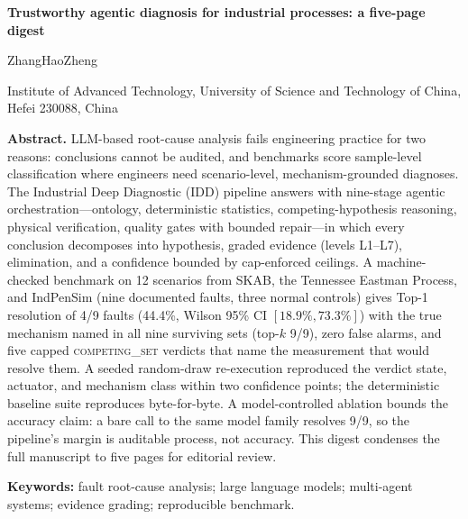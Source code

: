 \documentclass[10pt]{article}
\begin{document}
\begin{center}
{\LARGE\bfseries Trustworthy agentic diagnosis for industrial processes: a five-page digest}\par\vspace{10pt}
{\large ZhangHaoZheng}\par\vspace{2pt}
{\small Institute of Advanced Technology, University of Science and Technology of China, Hefei 230088, China}\par\vspace{14pt}
\end{center}
\begin{center}
\begin{minipage}{0.9\textwidth}
\small
\noindent\textbf{Abstract.} LLM-based root-cause analysis fails engineering practice for two reasons: conclusions cannot be audited, and benchmarks score sample-level classification where engineers need scenario-level, mechanism-grounded diagnoses. The Industrial Deep Diagnostic (IDD) pipeline answers with nine-stage agentic orchestration---ontology, deterministic statistics, competing-hypothesis reasoning, physical verification, quality gates with bounded repair---in which every conclusion decomposes into hypothesis, graded evidence (levels L1--L7), elimination, and a confidence bounded by cap-enforced ceilings. A machine-checked benchmark on 12 scenarios from SKAB, the Tennessee Eastman Process, and IndPenSim (nine documented faults, three normal controls) gives Top-1 resolution of 4/9 faults (44.4\%, Wilson 95\% CI $[18.9\%,73.3\%]$) with the true mechanism named in all nine surviving sets (top-$k$ 9/9), zero false alarms, and five capped \mbox{\textsc{competing\_set}} verdicts that name the measurement that would resolve them. A seeded random-draw re-execution reproduced the verdict state, actuator, and mechanism class within two confidence points; the deterministic baseline suite reproduces byte-for-byte. A model-controlled ablation bounds the accuracy claim: a bare call to the same model family resolves 9/9, so the pipeline's margin is auditable process, not accuracy. This digest condenses the full manuscript to five pages for editorial review.\par\vspace{4pt}
\noindent\textbf{Keywords:} fault root-cause analysis; large language models; multi-agent systems; evidence grading; reproducible benchmark.
\end{minipage}
\end{center}
\vspace{16pt}
\end{document}
